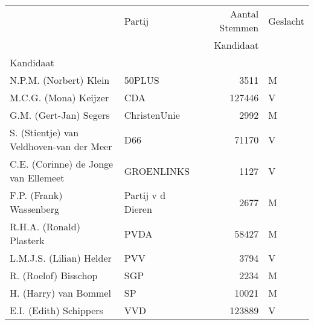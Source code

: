 \begin{tabular}{llrl}
\toprule
{} &                 Partij &  Aantal Stemmen  & Geslacht \\
  &                        &  Kandidaat & \\
Kandidaat                                &                        &                           &          \\
\midrule
N.P.M. (Norbert) Klein                   &                 50PLUS &                      3511 &        M \\
M.C.G. (Mona) Keijzer                    &                    CDA &                    127446 &        V \\
G.M. (Gert-Jan) Segers                   &           ChristenUnie &                      2992 &        M \\
S. (Stientje) van Veldhoven-van der Meer &                    D66 &                     71170 &        V \\
C.E. (Corinne) de Jonge van Ellemeet     &             GROENLINKS &                      1127 &        V \\
F.P. (Frank) Wassenberg                  &  Partij v d Dieren &                      2677 &        M \\
R.H.A. (Ronald) Plasterk                 &                   PVDA &                     58427 &        M \\
L.M.J.S. (Lilian) Helder                 &                    PVV &                      3794 &        V \\
R. (Roelof) Bisschop                     &                    SGP &                      2234 &        M \\
H. (Harry) van Bommel                    &                     SP &                     10021 &        M \\
E.I. (Edith) Schippers                   &                    VVD &                    123889 &        V \\
\bottomrule
\end{tabular}
